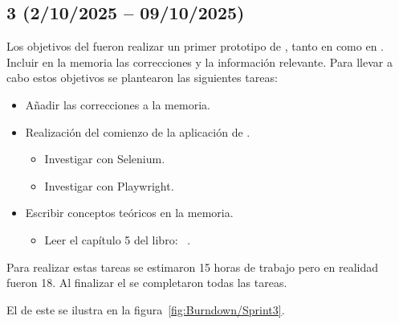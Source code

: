 \subsection{ 3 (2/10/2025 -- 09/10/2025)}
Los objetivos del  fueron realizar un primer prototipo de , tanto en  como en . Incluir en la memoria las correcciones y la información relevante.
Para llevar a cabo estos objetivos se plantearon las siguientes tareas:
\begin{itemize}
\tightlist
	\item Añadir las correcciones a la memoria.
	\item Realización del comienzo de la aplicación de .
	\begin{itemize}
	\tightlist
		\item Investigar  con Selenium.
		\item Investigar  con Playwright.
	\end{itemize}
	\item Escribir conceptos teóricos en la memoria.
	\begin{itemize}
	\tightlist
		\item Leer el capítulo 5 del libro: ~\cite{book:RAG_SimpleGuide}.
	\end{itemize}
\end{itemize}

Para realizar estas tareas se estimaron 15 horas de trabajo pero en realidad fueron 18. Al finalizar el  se completaron todas las tareas.

El  de este  se ilustra en la figura~\ref{fig:Burndown/Sprint3}.

